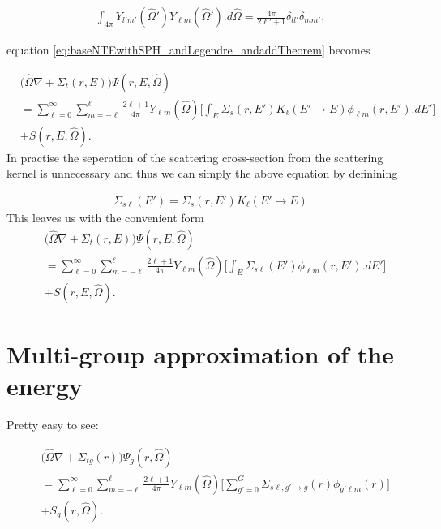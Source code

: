 \documentclass[11pt,letterpaper,titlepage]{article}
\newcommand{\beq}{\begin{equation*}
\begin{aligned}}
\newcommand{\eeq}{\end{aligned}
\end{equation*}}
\numberwithin{equation}{section}
\begin{document}
\begin{align} \label{eq:orthogonalitySPH}
\int_{4\pi} Y_{l'm'}(\hat{\Omega}')Y_{\ell m} (\hat{\Omega}').d\hat{\Omega} =
\frac{4\pi}{2\ell' +1} \delta_{ll'} \delta_{mm'},
\end{align}

\noindent equation \ref{eq:baseNTEwithSPH_andLegendre_andaddTheorem} becomes

\begin{equation} 
\begin{aligned}
&\biggr(\hat{\Omega}\nabla +\Sigma_t (r,E)\biggr)  \Psi (r,E,\hat{\Omega})\\
&= \sum_{\ell=0}^{\infty}\sum_{m=-\ell}^{\ell} \frac{2\ell+1}{4\pi}Y_{\ell m}(\hat{\Omega})
\biggr[ \int_E 
\Sigma_s (r,E')
  K_\ell (E'{\to}E)  \phi_{\ell m} (r,E').dE' 
 \biggr] \\
&+  S (r,E,\hat{\Omega}).
\end{aligned}
\end{equation}
\newline
In practise the seperation of the scattering cross-section from the scattering kernel is unnecessary and thus we can simply the above equation by definining 

\beq 
\Sigma_{s\ell} (E') = \Sigma_s (r,E')
  K_\ell (E'{\to}E)
\eeq 
\newline
This leaves us with the convenient form
\begin{equation} 
\begin{aligned}
&\biggr(\hat{\Omega}\nabla +\Sigma_t (r,E)\biggr)  \Psi (r,E,\hat{\Omega})\\
&= \sum_{\ell=0}^{\infty}\sum_{m=-\ell}^{\ell} \frac{2\ell+1}{4\pi}Y_{\ell m}(\hat{\Omega})
\biggr[ \int_E 
\Sigma_{s\ell} (E')  \phi_{\ell m} (r,E').dE' 
 \biggr] \\
&+  S (r,E,\hat{\Omega}).
\end{aligned}
\end{equation}


\vspace{1cm}
\section{Multi-group approximation of the energy}
Pretty easy to see:


\begin{equation} \label{eq:multiGroupNTE}
\begin{aligned}
&\biggr(\hat{\Omega}\nabla +\Sigma_{tg} (r)\biggr)  \Psi_g (r,\hat{\Omega})\\
&= \sum_{\ell=0}^{\infty}\sum_{m=-\ell}^{\ell}\frac{2\ell+1}{4\pi} Y_{\ell m}(\hat{\Omega})
\biggr[ \sum_{g'=0}^{G}
\Sigma_{s\ell,g'{\to}g} (r)
  \phi_{g'\ell m} (r)
\biggr]\\
&+  S_g (r,\hat{\Omega}).
\end{aligned}
\end{equation}
\end{document}
